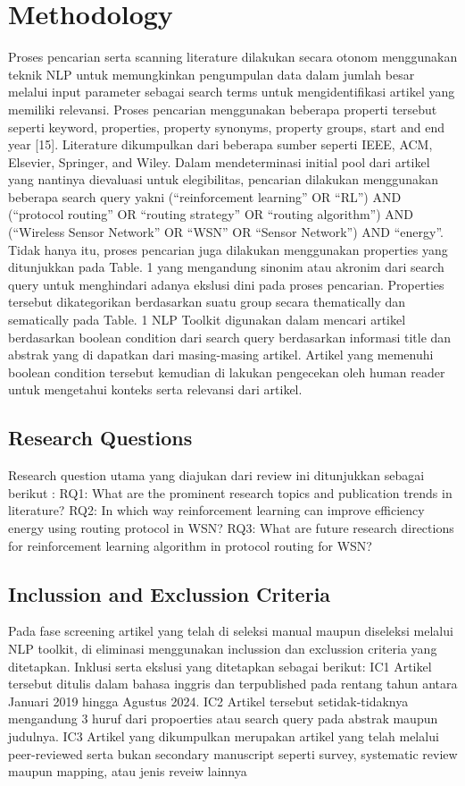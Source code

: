 \documentclass[conference]{IEEEtran}
\begin{document}
\section{Methodology}
Proses pencarian serta scanning literature dilakukan secara otonom menggunakan teknik NLP untuk memungkinkan pengumpulan data dalam jumlah besar melalui input parameter sebagai search terms untuk mengidentifikasi artikel yang memiliki relevansi. Proses pencarian menggunakan beberapa properti tersebut seperti keyword, properties, property synonyms, property groups, start and end year [15]. Literature dikumpulkan dari beberapa sumber seperti IEEE, ACM, Elsevier, Springer, and Wiley. Dalam mendeterminasi initial pool dari artikel yang nantinya dievaluasi untuk elegibilitas, pencarian dilakukan menggunakan beberapa search query yakni (“reinforcement learning” OR “RL”) AND (“protocol routing” OR “routing strategy” OR “routing algorithm”) AND (“Wireless Sensor Network” OR “WSN” OR “Sensor Network”) AND “energy”. Tidak hanya itu, proses pencarian juga dilakukan menggunakan properties yang ditunjukkan pada Table. 1 yang mengandung sinonim atau akronim dari search query untuk menghindari adanya ekslusi dini pada proses pencarian. Properties tersebut dikategorikan berdasarkan suatu group secara thematically dan sematically pada Table. 1 NLP Toolkit digunakan dalam mencari artikel berdasarkan boolean condition dari search query berdasarkan informasi title dan abstrak yang di dapatkan dari masing-masing artikel. Artikel yang memenuhi boolean condition tersebut kemudian di lakukan pengecekan oleh human reader untuk mengetahui konteks serta relevansi dari artikel.

\subsection{Research Questions}
Research question utama yang diajukan dari review ini ditunjukkan sebagai berikut :
RQ1: What are the prominent research topics and publication trends in literature?	
RQ2: In which way reinforcement learning can improve efficiency energy using routing protocol in WSN?
RQ3: What are future research directions for reinforcement learning algorithm in protocol routing for WSN?

\subsection{Inclussion and Exclussion Criteria}
Pada fase screening artikel yang telah di seleksi manual maupun diseleksi melalui NLP toolkit, di eliminasi menggunakan inclussion dan exclussion criteria yang ditetapkan. Inklusi serta ekslusi yang ditetapkan sebagai berikut:
IC1	Artikel tersebut ditulis dalam bahasa inggris dan terpublished pada rentang tahun antara Januari 2019 hingga Agustus 2024.
IC2	Artikel tersebut setidak-tidaknya mengandung 3 huruf dari propoerties atau search query pada abstrak maupun judulnya.
IC3	Artikel yang dikumpulkan merupakan artikel yang telah melalui peer-reviewed serta bukan secondary manuscript seperti survey, systematic review maupun mapping, atau jenis reveiw lainnya
\end{document}
